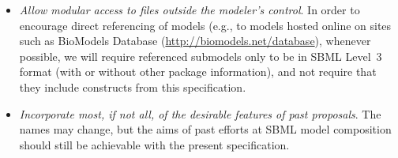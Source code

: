 \begin{itemize}
\item \emph{Allow modular access to files outside the modeler's control}.  In order to encourage direct referencing of models (e.g., to models hosted online on sites such as BioModels Database (\url{http://biomodels.net/database}), whenever possible, we will require referenced submodels only to be in SBML Level~3 format (with or without other package information), and not require that they include constructs from this specification.

\item \emph{Incorporate most, if not all, of the desirable features of past proposals}. The names may change, but the aims of past efforts at SBML model composition should still be achievable with the present specification.

\end{itemize}

